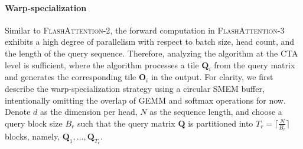 \paragraph{Warp-specialization}
Similar to \textsc{FlashAttention-2}, the forward computation in \textsc{FlashAttention-3} exhibits a high degree of parallelism with respect to batch size, head count, and the length of the query sequence. Therefore, analyzing the algorithm at the CTA level is sufficient, where the algorithm processes a tile $\mathbf{Q}_i$ from the query matrix and generates the corresponding tile $\mathbf{O}_i$ in the output. For clarity, we first describe the warp-specialization strategy using a circular SMEM buffer, intentionally omitting the overlap of GEMM and softmax operations for now. Denote $d$ as the dimension per head, $N$ as the sequence length, and choose a query block size $B_r$ such that the query matrix $\mathbf{Q}$ is partitioned into $T_r = \lceil \frac{N}{B_r} \rceil$ blocks, namely, $\mathbf{Q}_1, ..., \mathbf{Q}_{T_r}$.

